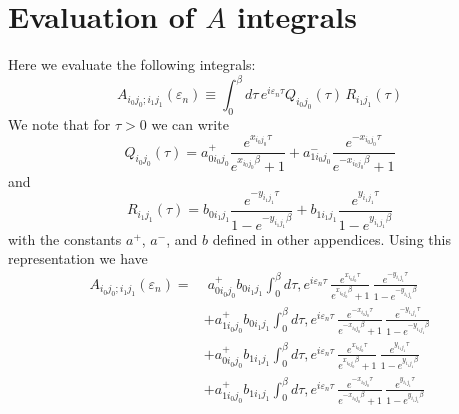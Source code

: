 \chapter{Evaluation of $A$ integrals}

Here we evaluate the following integrals:
\begin{equation}
A_{i_0 j_0; i_1 j_1}(\varepsilon_n)  \equiv 
\int_0^{\beta}d\tau\,e^{i\varepsilon_n \tau}
Q_{i_0 j_0}(\tau)\,R_{i_1 j_1}(\tau) 
\end{equation}
We note that for $\tau > 0$ we can write
\begin{equation}
Q_{i_0 j_0}(\tau)  =  a^{+}_{0 i_0 j_0} 
\frac{e^{x_{i_0 j_0} \tau}}{e^{x_{i_0 j_0} \beta}+1} +
a^{-}_{1 i_0 j_0}
\frac{e^{-x_{i_0 j_0} \tau}}{e^{-x_{i_0 j_0} \beta}+1} 
\end{equation}
and
\begin{equation}
R_{i_1 j_1}(\tau) = b_{0 i_1 j_1} 
\frac{e^{-y_{i_1 j_1} \tau}}{1 - e^{-y_{i_1 j_1} \beta}} +
b_{1 i_1 j_1}
\frac{e^{y_{i_1 j_1} \tau}}{1 - e^{y_{i_1 j_1} \beta}}
\end{equation}
with the constants $a^+$, $a^-$, and $b$ defined
in other appendices.
Using this representation we have
\begin{equation}
\begin{split}
A_{i_0 j_0; i_1 j_1}(\varepsilon_n) = &
\; a^+_{0 i_0 j_0} b_{0 i_1 j_1} \int_0^{\beta} d\tau, 
 e^{i \varepsilon_n \tau}\, 
\frac{e^{x_{i_0 j_0} \tau}}{e^{x_{i_0 j_0} \beta}+1}
\,\frac{e^{-y_{i_1 j_1} \tau}}{1 - e^{-y_{i_1 j_1} \beta}} \\
& +
a^+_{1 i_0 j_0} b_{0 i_1 j_1} \int_0^{\beta} d\tau, 
 e^{i \varepsilon_n \tau}\, 
\frac{e^{-x_{i_0 j_0} \tau}}{e^{-x_{i_0 j_0} \beta}+1}
\,\frac{e^{-y_{i_1 j_1} \tau}}{1 - e^{-y_{i_1 j_1} \beta}} \\
& +
a^+_{0 i_0 j_0} b_{1 i_1 j_1} \int_0^{\beta} d\tau, 
 e^{i \varepsilon_n \tau}\, 
\frac{e^{x_{i_0 j_0} \tau}}{e^{x_{i_0 j_0} \beta}+1}
\,\frac{e^{y_{i_1 j_1} \tau}}{1 - e^{y_{i_1 j_1} \beta}} \\
& +
a^+_{1 i_0 j_0} b_{1 i_1 j_1} \int_0^{\beta} d\tau, 
 e^{i \varepsilon_n \tau}\, 
\frac{e^{-x_{i_0 j_0} \tau}}{e^{-x_{i_0 j_0} \beta}+1}
\,\frac{e^{y_{i_1 j_1} \tau}}{1 - e^{y_{i_1 j_1} \beta}} 
\end{split}
\end{equation}

